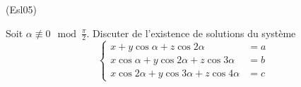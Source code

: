 \begin{tiny}(Esl05)\end{tiny} Soit $\alpha \not \equiv 0 \mod \frac{\pi}{2}$. Discuter de l'existence de solutions du système
\begin{displaymath}
 \left\lbrace 
\begin{aligned}
 x + y\cos\alpha + z\cos 2\alpha &= a \\
 x\cos \alpha + y\cos 2\alpha + z\cos 3\alpha &= b\\
 x\cos 2\alpha + y\cos 3\alpha + z\cos 4\alpha  &= c
\end{aligned}
\right. 
\end{displaymath}
